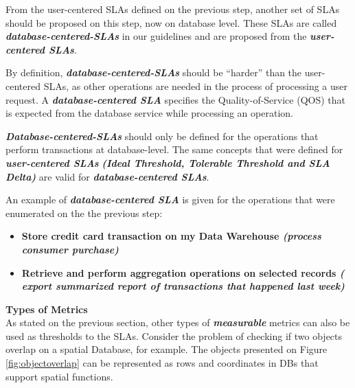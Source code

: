 From the user-centered SLAs defined on the previous step, another set of SLAs should be proposed on this step, now on database level. These SLAs are called \textbf{\textit{database-centered-SLAs}} in our guidelines and are proposed from the \textbf{\textit{user-centered SLAs}}.

By definition, \textbf{\textit{database-centered-SLAs}} should be ``harder'' than the user-centered SLAs, as other operations are needed in the process of processing a user request. A \textbf{\textit{database-centered SLA}} specifies the Quality-of-Service (QOS) that is expected from the database service while processing an operation.

\textbf{ \textit{Database-centered-SLAs}} should only be defined for the operations that perform transactions at database-level. The same concepts that were defined for \textbf{\textit{user-centered SLAs}} \textbf{\textit{(Ideal Threshold, Tolerable Threshold and SLA Delta)}} are valid for \textbf{\textit{database-centered SLAs}}.

An example of \textbf{\textit{database-centered SLA}} is given for the operations that were enumerated on the the previous step: 

\begin{itemize}
\item{ 
\textbf{Store credit card transaction on my Data Warehouse \textit{(process consumer purchase)}}
}

\item{
\textbf{Retrieve and perform aggregation operations on selected records \textit{( export summarized report of transactions that happened last week)}}
}
\end{itemize}

\textbf{Types of Metrics} \\

As stated on the previous section, other types of \textbf{\textit{measurable}} metrics can also be used as thresholds to the SLAs. Consider the problem of checking if two objects overlap on a spatial Database, for example. The objects presented on Figure \ref{fig:objectoverlap} can be represented as rows and coordinates in DBs that support spatial functions. 


